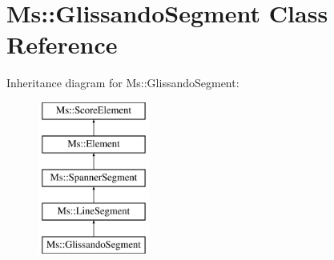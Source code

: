 \hypertarget{class_ms_1_1_glissando_segment}{}\section{Ms\+:\+:Glissando\+Segment Class Reference}
\label{class_ms_1_1_glissando_segment}
Inheritance diagram for Ms\+:\+:Glissando\+Segment\+:\begin{figure}[H]
\begin{center}
\leavevmode
\includegraphics[height=5.000000cm]{class_ms_1_1_glissando_segment}
\end{center}
\end{figure}
